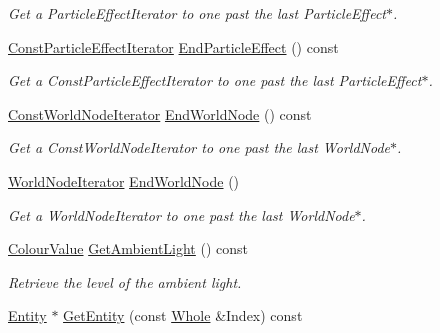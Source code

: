 \begin{DoxyCompactItemize}
\begin{DoxyCompactList}\small\item\em Get a ParticleEffectIterator to one past the last ParticleEffect$\ast$. \item\end{DoxyCompactList}\item 
\hyperlink{classMezzanine_1_1SceneManager_ab1213cec08b0bc15ea58ed0d3617b887}{ConstParticleEffectIterator} \hyperlink{classMezzanine_1_1SceneManager_a27b7aab28a19e1ff92f09828b731877e}{EndParticleEffect} () const 
\begin{DoxyCompactList}\small\item\em Get a ConstParticleEffectIterator to one past the last ParticleEffect$\ast$. \item\end{DoxyCompactList}\item 
\hyperlink{classMezzanine_1_1SceneManager_ad60b6e15daa2395944d395b4e307b905}{ConstWorldNodeIterator} \hyperlink{classMezzanine_1_1SceneManager_a603612da0ee539bb489184c2895431d8}{EndWorldNode} () const 
\begin{DoxyCompactList}\small\item\em Get a ConstWorldNodeIterator to one past the last WorldNode$\ast$. \item\end{DoxyCompactList}\item 
\hyperlink{classMezzanine_1_1SceneManager_a498b2390acb176a185e1026d23b773f0}{WorldNodeIterator} \hyperlink{classMezzanine_1_1SceneManager_a659a0804a38a84627b3d8bec1021e6e3}{EndWorldNode} ()
\begin{DoxyCompactList}\small\item\em Get a WorldNodeIterator to one past the last WorldNode$\ast$. \item\end{DoxyCompactList}\item 
\hyperlink{classMezzanine_1_1ColourValue}{ColourValue} \hyperlink{classMezzanine_1_1SceneManager_ab23edaf46108b6cd00e64d4338bfc993}{GetAmbientLight} () const 
\begin{DoxyCompactList}\small\item\em Retrieve the level of the ambient light. \item\end{DoxyCompactList}\item 
\hyperlink{classMezzanine_1_1Entity}{Entity} $\ast$ \hyperlink{classMezzanine_1_1SceneManager_a9ac227854187f7c3e6ecd5acd171888d}{GetEntity} (const \hyperlink{namespaceMezzanine_adcbb6ce6d1eb4379d109e51171e2e493}{Whole} \&Index) const 

\end{DoxyCompactItemize}
